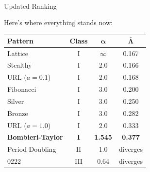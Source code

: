 \documentclass[aspectratio=169, 11pt]{beamer}
\begin{document}
\begin{frame}{Updated Ranking}

Here's where everything stands now:

\vspace{0.3em}
\centering
\begin{tabular}{lccc}
\toprule
\textbf{Pattern} & \textbf{Class} & $\boldsymbol{\alpha}$ & $\boldsymbol{\bar{\Lambda}}$ \\
\midrule
Lattice & I & $\infty$ & 0.167 \\
Stealthy & I & 2.0 & 0.166 \\
URL ($a=0.1$) & I & 2.0 & 0.168 \\
Fibonacci & I & 3.0 & 0.200 \\
Silver & I & 3.0 & 0.250 \\
Bronze & I & 3.0 & 0.282 \\
URL ($a=1.0$) & I & 2.0 & 0.333 \\
\rowcolor{resultbg}
\textbf{Bombieri-Taylor} & \textbf{I} & \textbf{1.545} & \textbf{0.377} \\
\midrule
Period-Doubling & II & 1.0 & diverges \\
0222 & III & 0.64 & diverges \\
\bottomrule
\end{tabular}
\end{frame}
\end{document}

